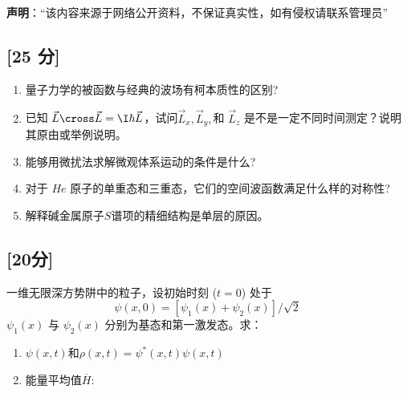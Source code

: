 
\textbf{声明}：“该内容来源于网络公开资料，不保证真实性，如有侵权请联系管理员”

\subsection{[25 分]}
\begin{enumerate}
\item 量子力学的被函数与经典的波场有柯本质性的区别?
\item 已知 $\vec L \cross \vec L = \I \hbar \vec L$，试问$\vec L_x, \vec L_y,$和 $\vec L_z$ 是不是一定不同时间测定？说明其原由或举例说明。
\item 能够用微扰法求解微观体系运动的条件是什么?
\item 对于 $He$ 原子的单重态和三重态，它们的空间波函数满足什么样的对称性?
\item 解释碱金属原子$S$谱项的精细结构是单层的原因。
\end{enumerate}
\subsection{[20分]}
一维无限深方势阱中的粒子，设初始时刻 ($t = 0$) 处于
\[
\psi(x, 0) = [\psi_1(x) + \psi_2(x)]/\sqrt{2}~
\]
$\psi_1(x)$ 与 $\psi_2(x)$ 分别为基态和第一激发态。求：
\begin{enumerate}
\item $\psi(x, t)$和$\rho(x,t) = \psi^*(x,t)\psi(x,t)$
\item 能量平均值$\overline{H} $:
\end{enumerate}
